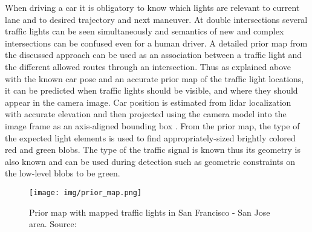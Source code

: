 \documentclass[letterpaper, 10 pt, conference]{ieeeconf} %
\begin{document}
When driving a car it is obligatory to know which lights are relevant to current lane and to desired trajectory and next maneuver. At double intersections several traffic lights can be seen simultaneously and semantics of new and complex intersections can be confused even for a human driver. A detailed prior map from the discussed approach can be used as an association between a traffic light and the different allowed routes through an intersection. Thus as explained above with the known car pose and an accurate prior map of the traffic light locations, it can be predicted when traffic lights should be visible, and where they should appear in the camera image. Car position is estimated from lidar localization with accurate elevation and then projected using the camera model into the image frame as an axis-aligned bounding box \cite{c5}. From the prior map, the type of the expected light elements is used to find appropriately-sized brightly colored red and green blobs. The type of the traffic signal is known thus its geometry is also known and can be used during detection such as geometric constraints on the low-level blobs to be green. 

\begin{figure}[thpb]
	\centering
	\texttt{[image: img/prior\_map.png]}
	\caption{Prior map with mapped traffic lights in San Francisco - San Jose area. Source: \cite{c5}} 
	\label{prior_map}
\end{figure}
\end{document}
